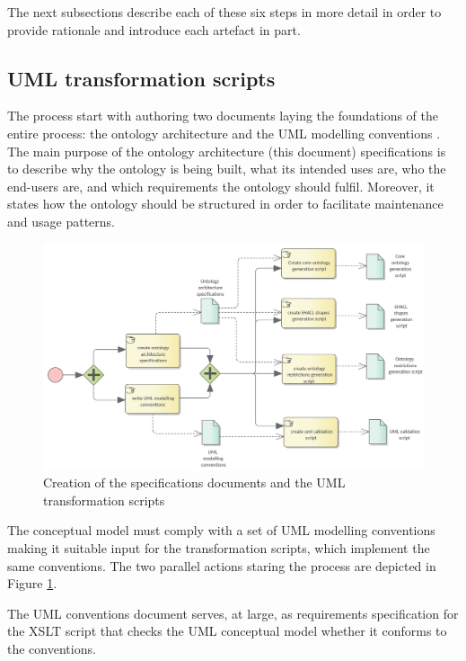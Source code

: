 	The next subsections describe each of these six steps in more detail in order to provide rationale and introduce each artefact in part.
	
	\subsection{UML transformation scripts}
	\label{sec:uml-transformation}
	
	The process start with authoring two documents laying the foundations of the entire process: the ontology architecture and the UML modelling conventions \citep{costetchi2020b}. The main purpose of the ontology architecture (this document) specifications is to describe why the ontology is being built, what its intended uses are, who the end-users are, and which requirements the ontology should fulfil. Moreover, it states how the ontology should be structured in order to facilitate maintenance and usage patterns.
	
	
	\begin{figure}[!ht]		
		\centering
		\includegraphics[width=\textwidth]{../img/uml2formalScriptCreation.png}
		\caption{Creation of the specifications documents and the UML transformation scripts}
		\label{fig:uml-transformation}
	\end{figure}
	
	The conceptual model must comply with a set of UML modelling conventions making it suitable input for the transformation scripts, which implement the same conventions. The two parallel actions staring the process are depicted in Figure \ref{fig:uml-transformation}.
		
	The UML conventions document serves, at large, as requirements specification for the XSLT script that checks the UML conceptual model  whether it conforms to the conventions.
	
